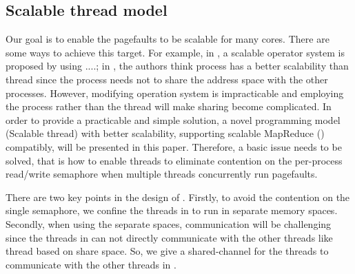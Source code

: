 
\subsection{Scalable thread model}

Our goal is to enable the pagefaults to be scalable  for many cores.
There are some ways to achieve this target. 
For example, in \cite{Clements2012Scalable},  a scalable operator system is proposed by using ....;
in \cite{},  the authors think process has a better scalability than thread since the process needs not to share the address space with the other processes.
However, modifying operation system is impracticable and employing the process rather than the thread will make sharing become complicated. 
In order to provide a practicable and simple solution, a novel programming model \myth (Scalable thread) with better scalability,  supporting scalable MapReduce (\myds) compatibly, will be presented in this paper.
Therefore, a basic issue needs to be solved, that is how to enable threads to eliminate contention on the per-process read/write semaphore when multiple threads concurrently run pagefaults.


There are two key points in the design of \myth.
Firstly, to avoid the contention on the single semaphore, we confine the threads in \myth to run in separate memory spaces.
Secondly, when using the separate spaces, communication will be challenging since
the threads in \myth can not directly communicate with the other threads like thread based on share space.
So, we give a shared-channel for the threads to communicate with the other threads in \myth.

